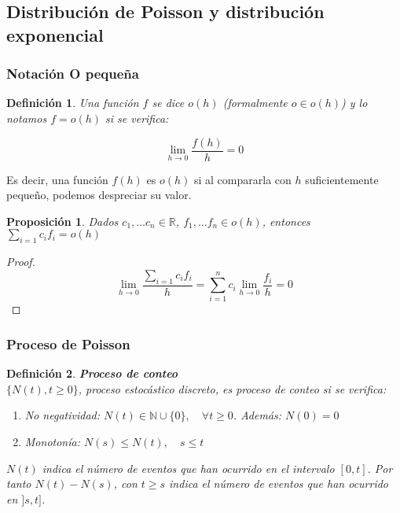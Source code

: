 \documentclass[a4paper,10pt]{scrartcl}
\newtheorem{mydefn}{Definición}
\newtheorem{fact}{Proposición}
\numberwithin{equation}{section}
\begin{document}
\subsection{Distribución de Poisson y distribución exponencial}

\subsubsection{Notación O pequeña}
  \begin{mydefn} 
  Una función $f$ se dice $o(h)$ (formalmente $o\in o(h)$) y lo notamos $f=o(h)$ si se verifica:
  
  \[\lim_{h\rightarrow 0} \frac{f(h)}{h} = 0\]
  \end{mydefn}

  Es decir, una función $f(h)$ es $o(h)$ si al compararla con $h$ suficientemente pequeño, podemos despreciar su
  valor.

  \begin{fact}
  Dados $c_1, \ldots c_n \in \mathbb{R}$, $f_1, \ldots f_n \in o(h)$, entonces $\sum_{i=1} c_i f_i = o(h)$
  \end{fact}

  \begin{proof}
  \[\lim_{h\rightarrow 0} \frac{\sum_{i=1} c_i f_i}{h} = \sum_{i=1}^n{c_i \lim_{h\rightarrow 0} \frac{f_i}{h}} = 0\]
  \end{proof}

\subsubsection{Proceso de Poisson}

  \begin{mydefn} \textbf{Proceso de conteo}\\
  $\{N(t), t\ge 0\}$, proceso estocástico discreto, es proceso de conteo si se verifica:
  \begin{enumerate}
    \item No negatividad: $N(t) \in \mathbb{N}\cup\{0\}, \quad \forall t\ge 0$. Además: $N(0)=0$
    \item Monotonía: $N(s) \le N(t), \quad s \le t$
  \end{enumerate}

  $N(t)$ indica el número de eventos que han ocurrido en el intervalo $[0,t]$. Por tanto $N(t)- N(s)$, con $t\ge s$
  indica el número de eventos que han ocurrido en $]s,t]$.
  \end{mydefn}
\end{document}
